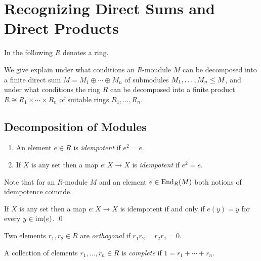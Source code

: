 \section{Recognizing Direct Sums and Direct Products}


\begin{conventions}
  In the following $R$ denotes a ring.
\end{conventions}


\begin{fluff}
  We give explain under what conditions an $R$-moudule $M$ can be decomposed into a finite direct sum $M = M_1 \oplus \dotsb \oplus M_n$ of submodules $M_1, \dotsc, M_n \leq M$, and under what conditions the ring $R$ can be decomposed into a finite product $R \cong R_1 \times \dotsb \times R_n$ of suitable rings $R_1, \dotsc, R_n$.
\end{fluff}





\subsection{Decomposition of Modules}


\begin{definition}
  \leavevmode
  \begin{enumerate}
    \item
      An element $e \in R$ is \emph{idempotent} if $e^2 = e$.
    \item
      If $X$ is any set then a map $e \colon X \to X$ is \emph{idempotent} if $e^2 = e$.
  \end{enumerate}
\end{definition}


\begin{remark}
  Note that for an $R$-module $M$ and an element $e \in \operatorname{End}_R(M)$ both notions of idempotence coincide.
\end{remark}


\begin{lemma}
  If $X$ is any set then a map $e \colon X \to X$ is idempotent if and only if $e(y) = y$ for every $y \in \operatorname{im}(e)$.
  \qed
\end{lemma}


\begin{definition}
  Two elements $r_1, r_2 \in R$ are \emph{orthogonal} if $r_1 r_2 = r_2 r_1 = 0$.
\end{definition}


\begin{definition}
  A collection of elements $r_1, \dotsc, r_n \in R$ is \emph{complete} if $1 = r_1 + \dotsb + r_n$.
\end{definition}



